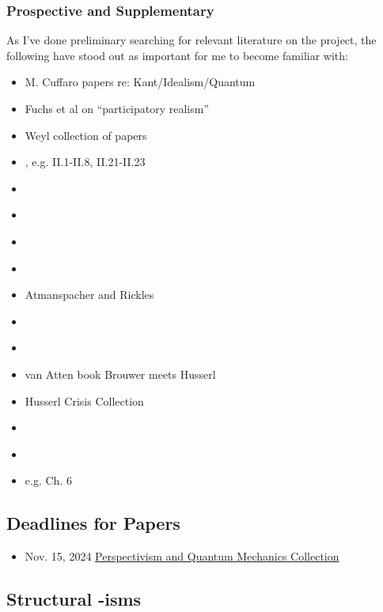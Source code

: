 \subsubsection{Prospective and Supplementary}

As I've done preliminary searching for relevant literature on the project, the following have stood out as important for me to become familiar with:

\begin{itemize}
    \item M. Cuffaro papers re: Kant/Idealism/Quantum
    \item Fuchs et al on ``participatory realism''
    \item Weyl collection of papers
    \item \cite{SchilppCassirer}, e.g. II.1-II.8, II.21-II.23
    \item \cite{Adorno1940}
    \item \cite{Clifford1878}
    \item \cite{Ewing1934}
    \item \cite{Kilmister1994}
    \item Atmanspacher and Rickles
    \item \cite{Cartwright1983}
    \item \cite{Torretti1999}
    \item van Atten book Brouwer meets Husserl
    \item Husserl Crisis Collection
    \item \cite{Zahar2001}
    \item \cite{Zahar2007}
    \item \cite{Kelsen1946} e.g. Ch. 6



\end{itemize}




\subsection{Deadlines for Papers}

\begin{itemize}
    \item Nov. 15, 2024 \href{https://link.springer.com/collections/cabhjbifbf}{Perspectivism and Quantum Mechanics Collection}
\end{itemize}




\subsection{Structural -isms}


